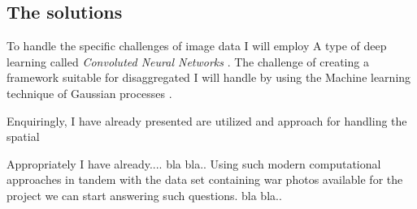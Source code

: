 \documentclass[a4paper]{article}
\begin{document}

\subsection{The solutions}





To handle the specific challenges of image data I will employ A type of deep learning called \emph{Convoluted Neural Networks} \cite[XXXX]{francois2017deep}. The challenge of creating a framework suitable for disaggregated I will handle by using the Machine learning technique of Gaussian processes \cite{williams2006gaussian}.\par 








Enquiringly, I have already presented are utilized and approach for handling the spatial 


Appropriately I have already.... bla bla.. Using such modern computational approaches in tandem with the data set containing war photos available for the project we can start answering such questions. bla bla.. \par
\end{document}
